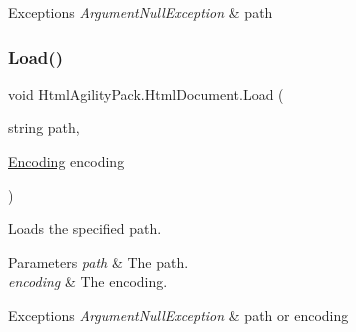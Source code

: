 \begin{DoxyExceptions}{Exceptions}
{\em Argument\+Null\+Exception} & path\\
\hline
\end{DoxyExceptions}
\mbox{\label{class_html_agility_pack_1_1_html_document_a9071a8a3f0ce5df5749e2aa8f6e17508}} 
\subsubsection{\texorpdfstring{Load()}{Load()}\hspace{0.1cm}{\footnotesize\ttfamily [7/11]}}
{\footnotesize\ttfamily void Html\+Agility\+Pack.\+Html\+Document.\+Load (\begin{DoxyParamCaption}\item[{string}]{path,  }\item[{\hyperlink{class_html_agility_pack_1_1_html_document_a220bdf28a5e35f4898075084be2d59f0}{Encoding}}]{encoding }\end{DoxyParamCaption})\hspace{0.3cm}{\ttfamily [inline]}}



Loads the specified path. 


\begin{DoxyParams}{Parameters}
{\em path} & The path.\\
\hline
{\em encoding} & The encoding.\\
\hline
\end{DoxyParams}

\begin{DoxyExceptions}{Exceptions}
{\em Argument\+Null\+Exception} & path or encoding \\
\hline
\end{DoxyExceptions}
\mbox{\label{class_html_agility_pack_1_1_html_document_ab9640d6c2f1756965237cee712b89461}} 
